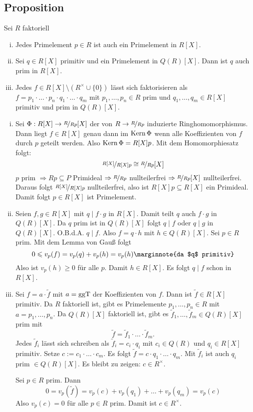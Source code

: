 \subsection[{Proposition: Primelemente in $R[X]$ und Faktorisierung in $R[X]$}]{Proposition} %
\label{sub:817}
Sei $R$ faktoriell
\begin{enumerate}[i)]
	\item Jedes Primelement $p \in R$ ist auch ein Primelement in $R[X]$.
	\item Sei $q \in R[X]$ primitiv und ein Primelement in $Q(R)[X]$. Dann ist $q$ auch prim in $R[X]$.
	\item Jedes $f \in R[X]\setminus (R^\times \cup \{0\})$ lässt sich faktorisieren als $f=p_1 \cdot \ldots \cdot p_n \cdot q_1 \cdot \ldots \cdot q_m$ mit 
	$p_1, \ldots , p_n \in R$ prim und $q_1, \ldots , q_m \in R[X]$ primitiv und prim in $Q(R)[X]$.
\end{enumerate}
\begin{enumerate}[i)]
	\item Sei $\Phi : R[X] \to \nicefrac{R}{Rp}[X]$ der von $R \to \nicefrac{R}{Rp}$ induzierte Ringhomomorphismus. Dann liegt $f \in R[X]$ genau dann im $\operatorname{Kern} \Phi $
	wenn alle Koeffizienten von $f$ durch $p$ geteilt werden. Also $\operatorname{Kern} \Phi = R[X]p$. Mit dem Homomorphiesatz folgt:
	\[
		\nicefrac{R[X]}{R[X]p} \cong \nicefrac{R}{Rp}[X]
	\]
	$p$ prim $\Rightarrow Rp \subseteq P$ Primideal $\Rightarrow \nicefrac{R}{Rp}$ nullteilerfrei $\Rightarrow \nicefrac{R}{Rp}[X]$ nullteilerfrei.
	Daraus folgt $\nicefrac{R[X]}{R[X]p}$ nullteilerfrei, also ist $R[X]p \subseteq R[X]$ ein Primideal. Damit folgt $p \in R[X]$ ist Primelement.
	\item Seien $f,g \in R[X]$ mit $q \mid f \cdot g$ in $R[X]$. Damit teilt $q$ auch $f \cdot g$ in $Q(R)[X]$. Da $q$ prim ist in $Q(R)[X]$ folgt $q \mid f$ oder 
	$q \mid g$ in $Q(R)[X]$. O.B.d.A. $q \mid f$. Also $f = q \cdot h$ mit $h \in Q(R)[X]$. Sei $p \in R$ prim. Mit dem Lemma von Gauß folgt
	\[
		0 \le v_p(f) = v_p(q) + v_p(h) = v_p(h) \marginnote{da $q$ primitiv}
	\]
	Also ist $v_p(h) \ge 0$ für alle $p$. Damit $h \in R[X]$. Es folgt $q \mid f$ schon in $R[X]$.
	\item Sei $f= a \cdot \tilde f$ mit $a= \operatorname{ggT}$ der Koeffizienten von $f$. Dann ist $\tilde f \in R[X]$ primitiv. Da $R$ faktoriell ist, gibt es Primelemente 
	$p_1, \ldots , p_n \in R$ mit $a= p_1, \ldots , p_n$. Da $Q(R)[X]$ faktoriell ist, 
	gibt es $\tilde f_1 , \ldots , \tilde f_m \in Q(R)[X]$ prim mit
	\[
		\tilde f = \tilde f_1 \cdot \ldots \cdot \tilde f_m.
	\]
	Jedes $\tilde f_i$ lässt sich schreiben als $\tilde f_i = c_i \cdot q_i$ mit $c_i \in Q(R)$ und $q_i \in R[X]$ primitiv. Setze $c := c_1 \cdot \ldots \cdot c_m$.
	Es folgt $\tilde f = c \cdot q_1 \cdot \ldots \cdot q_m$. Mit $\tilde f_i$ ist auch $q_i$ prim $\in Q(R)[X]$. Es bleibt zu zeigen: $c \in R^\times$.
	
	Sei $p \in R$ prim. Dann 
	\[
		0 = v_p(\tilde f) = v_p(c) + v_p(q_1) + \ldots + v_p(q_m) = v_p(c)
	\]
	Also $v_p(c) = 0$ für alle $p \in R$ prim. Damit ist $c \in R^\times$. \bewende
\end{enumerate}


